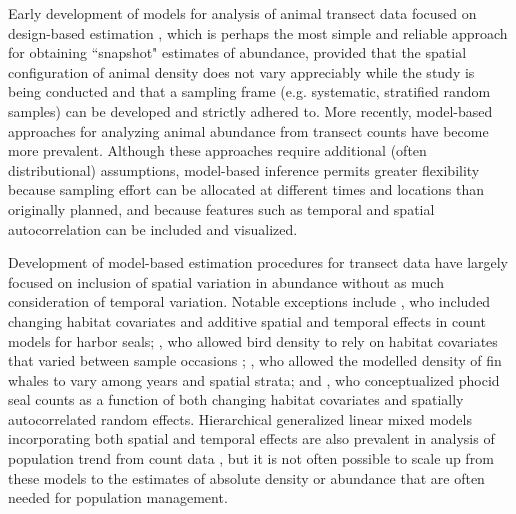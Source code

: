 \documentclass[times,mee,doublespace,]{besauth2}
\begin{document}
Early development of models for analysis of animal transect data \citep[see e.g.][and references therein]{BucklandEtAl2001} focused on design-based estimation \citep[cf.][]{Cochran1977}, which is perhaps the most simple and reliable approach for obtaining ``snapshot" estimates of abundance, provided that the spatial configuration of animal density does not vary appreciably while the study is being conducted and that a sampling frame (e.g. systematic, stratified random samples) can be developed and strictly adhered to.  More recently, model-based approaches for analyzing animal abundance from transect counts \citep[e.g.][]{HedleyBuckland2004,VerHoefJansen2007,JohnsonEtAl2010} have become more prevalent. Although these approaches require additional (often distributional) assumptions, model-based inference permits greater flexibility because sampling effort can be allocated at different times and locations than originally planned, and because features such as temporal \citep{Moore2011} and spatial \citep[see e.g.][]{MillerEtAl2013} autocorrelation can be included and visualized.

Development of model-based estimation procedures for transect data have largely focused on inclusion of spatial variation in abundance without as much consideration of temporal variation.  Notable exceptions include \citet{VerHoefJansen2007}, who included changing habitat covariates and additive spatial and temporal effects in count models for harbor seals; \citet{MillerEtAl11jwm}, who allowed bird density to rely on habitat covariates that varied between sample occasions \citep[using an N-mixture formulation; see][]{Royle2004}; \citet{Moore2011}, who allowed the modelled density of fin whales to vary among years and spatial strata; and \citet{VerHoefEtAl2014}, who conceptualized phocid seal counts as a function of both changing habitat covariates and spatially autocorrelated random effects.  Hierarchical generalized linear mixed models incorporating both spatial and temporal effects are also prevalent in analysis of population trend from count data \citep[e.g.][]{SauerLink2011,RossEtAl2012}, but it is not often possible to scale up from these models to the estimates of absolute density or abundance that are often needed for population management.
\end{document}
